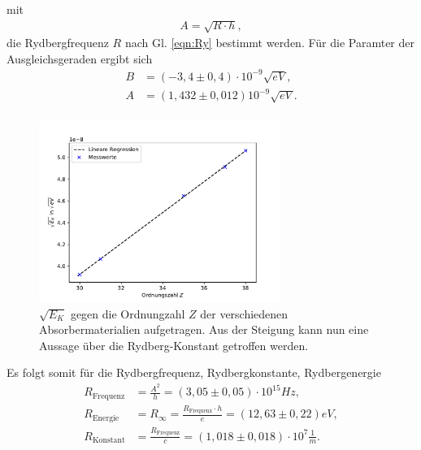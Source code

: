 mit
\begin{align}
    A=\sqrt{R\cdot h},
    \label{eqn:Ry}
\end{align}
die Rydbergfrequenz $R$ nach Gl. \ref{eqn:Ry} bestimmt werden.
Für die Paramter der Ausgleichsgeraden ergibt sich
\begin{align*}
    B&=(-3,4\pm 0,4)\cdot 10^{-9}\sqrt{\si{eV}},\\
    A&=(1,432\pm 0,012) 10^{-9}\sqrt{\si{eV}}.\\
\end{align*}
\begin{figure}[H]
    \centering
    \includegraphics[width=0.7\textwidth]{plots/Moseley.pdf}
    \caption{$\sqrt{E_K}$ gegen die Ordnungzahl $Z$ der verschiedenen Absorbermaterialien
    aufgetragen. Aus der Steigung kann nun eine Aussage über die Rydberg-Konstant getroffen werden.}
\end{figure}
Es folgt somit für die Rydbergfrequenz, Rydbergkonstante, Rydbergenergie
\begin{align*}
    R_{\text{Frequenz}}&=\frac{A^2}{h}=(3,05\pm 0,05)\cdot 10^{15}\si{Hz},\\
    R_{\text{Energie}}&=R_{\infty}=\frac{R_{\text{Frequenz}}\cdot h}{e}=(12,63\pm 0,22)\si{eV},\\
    R_{\text{Konstant}}&=\frac{R_{\text{Frequenz}}}{c}=(1,018\pm 0,018)\cdot 10^7\frac{1}{m}.
\end{align*}

\label{sec:Auswertung}
